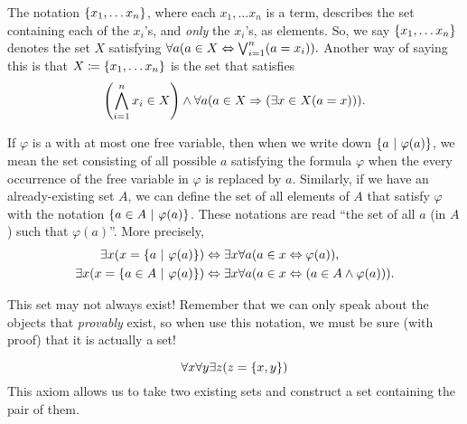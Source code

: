 \begin{definition}\label{not:setbuilder}
    The notation \(\set*{x_1, \dots x_n}\),
    where each \(x_1, \dots x_n\) is a term, 
    describes the set containing each of the \(x_i\)'s, and \emph{only} the \(x_i\)'s, as elements.
    So, we say \(\set*{x_1, \dots x_n}\) denotes the set \(X\) satisfying
    \(
        \forall a \pn*{a \in X \iff \bigjoin_{i = 1}^{n}\pn*{a = x_i}}.
    \)
    Another way of saying this is that \(X \defn \set*{x_1, \dots x_n}\) is the set that satisfies
    \[
        \pn*{\bigmeet_{i = 1}^{n}x_i \in X}
             \meet \forall a \pn*{a \in X \implies \pn*{\exists x \in X \pn*{a = x}}}.
    \]
\end{definition}

\begin{definition}
    If \(\varphi\) is a {\wff} with at most one free variable,
    then when we write down \(\set*{a \suchthat \varphi(a)}\),
    we mean the set consisting of all possible \(a\) satisfying the formula \(\varphi\)
    when the every occurrence of the free variable in \(\varphi\) is replaced by \(a\).
    Similarly, if we have an already-existing set \(A\),
    we can define the set of all elements of \(A\) that satisfy \(\varphi\)
    with the notation \(\set*{a \in A \suchthat \varphi(a)}\).
    These notations are read ``the set of all \(a\) (in \(A\)) such that \(\varphi(a)\)''.
    More precisely,
    \begin{align*}
        \exists x \pn*{x = \set*{a \suchthat \varphi(a)}}
            &\iff \exists x \forall a \pn*{a \in x \iff \varphi(a)},\\
        \exists x \pn*{x = \set*{a  \in A \suchthat \varphi(a)}}
            &\iff \exists x \forall a \pn*{a \in x \iff \pn*{a \in A \meet \varphi(a)}}.
    \end{align*}

    \begin{note}
        This set may not always exist!
        Remember that we can only speak about the objects that \emph{provably} exist,
        so when use this notation, we must be sure (with proof) that it is actually a set!
    \end{note}
\end{definition}

\begin{axiom}[Pairing]\label{ax:pairing}
    \vspace{-\abovedisplayskip}
    \[\forall x \forall y \exists z \pn*{z = \set*{x, y}}\]
    This axiom allows us to take two existing sets and construct a set containing the pair of them.
\end{axiom}

